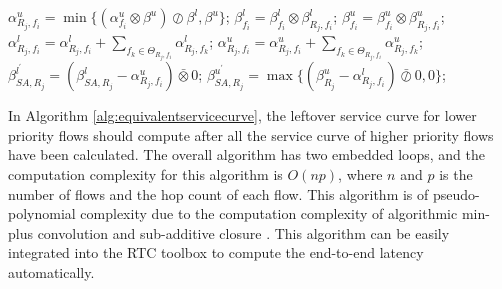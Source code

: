 \documentclass[10pt,journal]{IEEEtran}
\begin{document}
\begin{algorithm}
\begin{algorithmic}[1]
            \STATE $\alpha^u_{R_j,f_i}=\min\{(\alpha^u_{f_i}\otimes\beta^u)\oslash\beta^l,\beta^u\}$;
            \STATE $\beta_{f_i}^l=\beta_{f_i}^l\otimes\beta_{R_j,f_i}^l$; $\beta_{f_i}^u=\beta_{f_i}^u\otimes\beta_{R_j,f_i}^u$;
                    \STATE $\alpha^l_{R_j,f_i}=\alpha^l_{R_j,f_i}+\sum_{f_k\in\Theta_{R_j,f_i}}\alpha^l_{R_j,f_k}$;
                    \STATE $\alpha^u_{R_j,f_i}=\alpha^u_{R_j,f_i}+\sum_{f_k\in\Theta_{R_j,f_i}}\alpha^u_{R_j,f_k}$;
                \ENDIF
                \STATE $\beta^{l^\prime}_{SA,R_j}=(\beta^l_{SA,R_j}-\alpha^u_{R_j,f_i})\bar{\otimes}0$;
                \STATE $\beta^{u^\prime}_{SA,R_j}=\max\{(\beta^u_{R_j}-\alpha^l_{R_j,f_i})\bar{\oslash}0,0\}$;
            \ENDIF
        \ENDFOR
    \ENDFOR
\end{algorithmic}
\end{algorithm}

In Algorithm \ref{alg:equivalentservicecurve}, the leftover service curve for lower priority flows should compute after all the service curve of higher priority flows have been calculated. The overall algorithm has two embedded loops, and the computation complexity for this algorithm is $O(np)$, where $n$ and $p$ is the number of flows and the hop count of each flow. This algorithm is of pseudo-polynomial complexity due to the computation complexity of algorithmic min-plus convolution and sub-additive closure \cite{Bouillard2008}. This algorithm can be easily integrated into the RTC toolbox \cite{rtc} to compute the end-to-end latency automatically.
\end{document}
